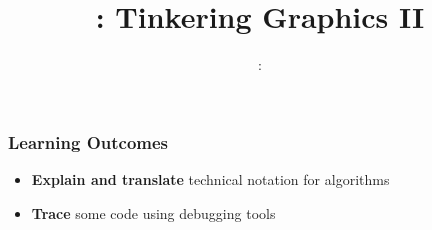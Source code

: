 \usepackage{../../beamerthemeFalmouthGamesAcademy}
\usepackage{multimedia}
\graphicspath{ {../../} }

\usepackage{textcomp}


\usepackage[normalem]{ulem}
\usepackage{wasysym}

\usepackage{pdfpages}

\usetikzlibrary{positioning, calc, shapes.geometric, shapes.multipart, 
	shapes, arrows.meta, arrows, 
	decorations.markings, external, trees, automata}





\title{\sessionnumber: Tinkering Graphics II}
\subtitle{\modulecode: \moduletitle}

\frame{\titlepage} 

\begin{frame}
	\frametitle{Learning Outcomes}
	\begin{itemize}
		\item\textbf{Explain and translate} technical notation for algorithms
		\item\textbf{Trace} some code using debugging tools
	\end{itemize}
\end{frame}








